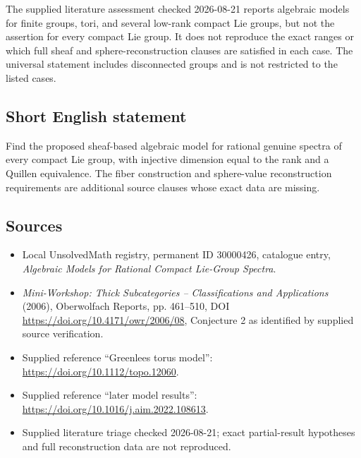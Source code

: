 \documentclass[11pt]{article}
\begin{document}
The supplied literature assessment checked 2026-08-21 reports algebraic models for finite groups, tori, and several low-rank compact Lie groups, but not the assertion for every compact Lie group. It does not reproduce the exact ranges or which full sheaf and sphere-reconstruction clauses are satisfied in each case. The universal statement includes disconnected groups and is not restricted to the listed cases.
\subsection{Short English statement}
Find the proposed sheaf-based algebraic model for rational genuine spectra of every compact Lie group, with injective dimension equal to the rank and a Quillen equivalence. The fiber construction and sphere-value reconstruction requirements are additional source clauses whose exact data are missing.
\subsection{Sources}
\begin{itemize}
\item Local UnsolvedMath registry, permanent ID 30000426, catalogue entry, \emph{Algebraic Models for Rational Compact Lie-Group Spectra}.
\item \emph{Mini-Workshop: Thick Subcategories -- Classifications and Applications} (2006), Oberwolfach Reports, pp. 461--510, DOI \url{https://doi.org/10.4171/owr/2006/08}, Conjecture 2 as identified by supplied source verification.
\item Supplied reference ``Greenlees torus model'': \url{https://doi.org/10.1112/topo.12060}.
\item Supplied reference ``later model results'': \url{https://doi.org/10.1016/j.aim.2022.108613}.
\item Supplied literature triage checked 2026-08-21; exact partial-result hypotheses and full reconstruction data are not reproduced.
\end{itemize}
\end{document}
